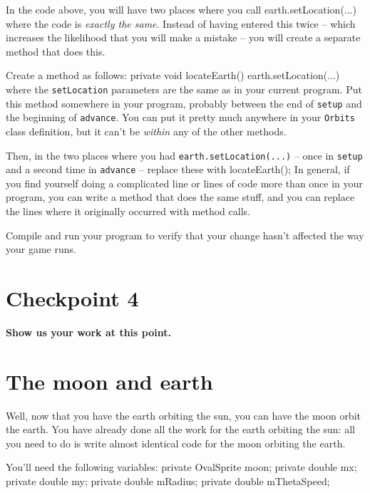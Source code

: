 \documentclass[11pt]{article}
\newenvironment{qv}%
  {\quote
   \verbatim}%
  {\endverbatim
   \endquote}
\begin{document}
In the code above, you will have two places where you call
\begin{qv}
earth.setLocation(...)
\end{qv}
where the code is {\em exactly the same}.
Instead of having entered this twice --
which increases the likelihood that you will make a mistake --
you will create a separate method that does this.

Create a method as follows:
\begin{qv}
private void locateEarth() {
  earth.setLocation(...)
}
\end{qv}
where the {\tt setLocation} parameters are the same
as in your current program.
Put this method somewhere in your program,
probably between the end of {\tt setup} and the beginning of {\tt advance}.
You can put it pretty much anywhere in your {\tt Orbits} class definition,
but it can't be {\em within} any of the other methods.

Then, in the two places where you had {\tt earth.setLocation(...)} --
once in {\tt setup} and a second time in {\tt advance} --
replace these with
\begin{qv}
locateEarth();
\end{qv}
In general, if you find yourself doing a complicated line or lines of code
more than once in your program,
you can write a method that does the same stuff,
and you can replace the lines where it originally occurred
with method calls.

Compile and run your program to verify that your change hasn't affected
the way your game runs.

\section*{Checkpoint 4}
{\bf
Show us your work at this point.
}

\section*{The moon and earth}
Well, now that you have the earth orbiting the sun,
you can have the moon orbit the earth.
You have already done all the work for the earth orbiting the sun:
all you need to do is write almost identical code
for the moon orbiting the earth.

You'll need the following variables:
\begin{qv}
private OvalSprite moon;
private double mx;
private double my;
private double mRadius;
private double mThetaSpeed;
\end{qv}
\end{document}
